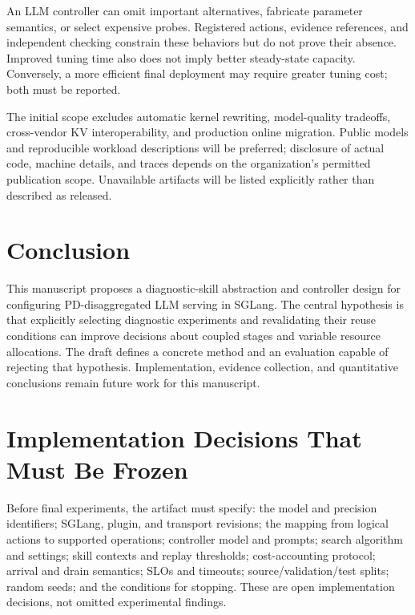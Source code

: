 \documentclass[11pt,a4paper]{article}
\begin{document}
An LLM controller can omit important alternatives, fabricate parameter semantics, or select expensive probes. Registered actions, evidence references, and independent checking constrain these behaviors but do not prove their absence. Improved tuning time also does not imply better steady-state capacity. Conversely, a more efficient final deployment may require greater tuning cost; both must be reported.

The initial scope excludes automatic kernel rewriting, model-quality tradeoffs, cross-vendor KV interoperability, and production online migration. Public models and reproducible workload descriptions will be preferred; disclosure of actual code, machine details, and traces depends on the organization's permitted publication scope. Unavailable artifacts will be listed explicitly rather than described as released.

\section{Conclusion}
This manuscript proposes a diagnostic-skill abstraction and controller design for configuring PD-disaggregated LLM serving in SGLang. The central hypothesis is that explicitly selecting diagnostic experiments and revalidating their reuse conditions can improve decisions about coupled stages and variable resource allocations. The draft defines a concrete method and an evaluation capable of rejecting that hypothesis. Implementation, evidence collection, and quantitative conclusions remain future work for this manuscript.

\appendix
\section{Implementation Decisions That Must Be Frozen}
Before final experiments, the artifact must specify: the model and precision identifiers; SGLang, plugin, and transport revisions; the mapping from logical actions to supported operations; controller model and prompts; search algorithm and settings; skill contexts and replay thresholds; cost-accounting protocol; arrival and drain semantics; SLOs and timeouts; source/validation/test splits; random seeds; and the conditions for stopping. These are open implementation decisions, not omitted experimental findings.
\end{document}
